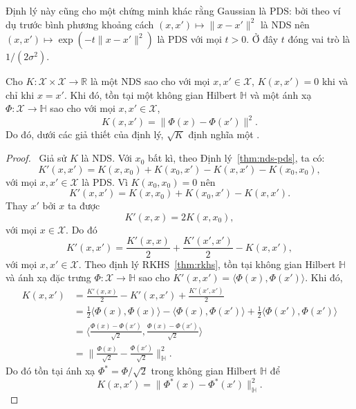 Định lý này cũng cho một chứng minh khác rằng  Gaussian là PDS: bởi
theo ví dụ trước bình phương khoảng cách $(x, x') \mapsto \lVert x - x'
\rVert^2$ là NDS nên $(x, x') \mapsto \exp(-t\lVert x - x' \rVert^2)$ là PDS
với mọi $t > 0$. Ở đây $t$ đóng vai trò là $1/(2\sigma^2)$.

\begin{thm}
  Cho $K\colon \mathcal{X} \times \mathcal{X} \to \mathbb{R}$ là một
   NDS sao cho với mọi $x, x' \in \mathcal{X}$, $K(x, x') = 0$ khi
  và chỉ khi $x = x'$. Khi đó, tồn tại một không gian Hilbert $\mathbb{H}$ và
  một ánh xạ $\Phi \colon \mathcal{X} \to \mathbb{H}$ sao cho với mọi $x, x'
  \in \mathcal{X}$, \begin{equation}
    K(x, x') = \bigl\lVert \Phi(x) - \Phi(x') \bigr\rVert^2.
  \end{equation} Do đó, dưới các giả thiết của định lý, $\sqrt{K}$ định nghĩa
  một .
\end{thm}

\begin{proof}\elaborate\
 Giả sử $K$ là NDS. Với $x_0$ bất kì, theo Định lý~\ref{thm:nds-pds}, ta có:
  \begin{equation}
    K'(x, x') = K(x, x_0) + K(x_0, x') - K(x, x') - K(x_0, x_0),
  \end{equation}với mọi $x, x' \in \mathcal{X}$ là PDS. Vì $K(x_0, x_0) = 0$
  nên \begin{equation}
    K'(x, x') = K(x, x_0) + K(x_0, x') - K(x, x').
  \end{equation} Thay $x'$ bởi $x$ ta được \begin{equation}
    K'(x, x) = 2K(x, x_0),
  \end{equation} với mọi $x \in \mathcal{X}$. Do đó \begin{equation}
    K'(x, x') = \frac{K'(x, x)}{2} + \frac{K'(x', x')}{2} - K(x, x'),
  \end{equation}với mọi $x, x' \in \mathcal{X}$.  Theo định lý
  RKHS~\ref{thm:rkhs}, tồn tại không gian Hilbert $\mathbb{H}$ và ánh xạ đặc
  trưng $\Phi\colon \mathcal{X}\to\mathbb{H}$ sao cho $K'(x, x') = \bigl\langle
  \Phi(x), \Phi(x') \big\rangle$. Khi đó, \begin{align}
    K(x, x') &= \frac{K'(x, x)}{2} - K'(x, x') + \frac{K'(x', x')}{2} \\
    &= \frac{1}{2}\bigl\langle \Phi(x), \Phi(x) \bigr\rangle - \bigl\langle
      \Phi(x), \Phi(x') \bigr\rangle + \frac{1}{2}\bigl\langle \Phi(x'), \Phi(x')
      \bigr\rangle \\
    &= \biggl\langle \frac{\Phi(x) - \Phi(x')}{\sqrt{2}}, \frac{\Phi(x) -
    \Phi(x')}{\sqrt{2}} \biggr\rangle \\
    &= \biggl\lVert \frac{\Phi(x)}{\sqrt{2}} - \frac{\Phi(x')}{\sqrt{2}}
    \biggr\rVert^2_\mathbb{H}.
  \end{align} Do đó tồn tại ánh xạ $\Phi^\ast = \Phi/\sqrt{2}$ trong không gian
  Hilbert $\mathbb{H}$ để \begin{equation}
    K(x, x') = \bigl\lVert \Phi^\ast(x) - \Phi^\ast(x')
    \bigr\rVert^2_\mathbb{H}.
  \end{equation}
\end{proof}

